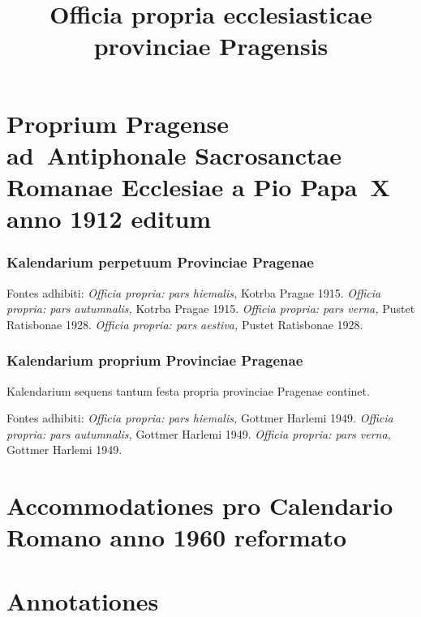 \documentclass[12pt, a5paper, twoside]{book}
\title{Officia propria ecclesiasticae provinciae Pragensis}
\begin{document}
\pagestyle{empty}

\setlength{\parindent}{0.5cm}

\maketitle

\cleardoublepage

\pagestyle{plain}



\part{Proprium Pragense ad~Antiphonale Sacrosanctae Romanae Ecclesiae
  a Pio Papa~X anno 1912 editum}

\section*{Kalendarium perpetuum Provinciae Pragenae}

{\footnotesize
  Fontes adhibiti:
  \emph{Officia propria: pars hiemalis,} Kotrba Pragae 1915.
  \emph{Officia propria: pars autumnalis,} Kotrba Pragae 1915.
  \emph{Officia propria: pars verna,} Pustet Ratisbonae 1928.
  \emph{Officia propria: pars aestiva,} Pustet Ratisbonae 1928.
}


\cleardoublepage

\section*{Kalendarium proprium Provinciae Pragenae}

{\footnotesize
  Kalendarium sequens tantum festa propria provinciae Pragenae
  continet.

  Fontes adhibiti:
  \emph{Officia propria: pars hiemalis,} Gottmer Harlemi 1949.
  \emph{Officia propria: pars autumnalis,} Gottmer Harlemi 1949.
  \emph{Officia propria: pars verna,} Gottmer Harlemi 1949.
}


\cleardoublepage



\vfill
\clearpage



\part{Accommodationes pro Calendario Romano anno 1960 reformato}





\part{Annotationes}




\printbibliography
\end{document}
